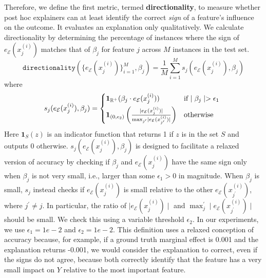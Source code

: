 \documentclass[mnsc,blindrev]{informs3}
\newcommand{\mE}{\mathcal{E}}
\begin{document}
    Therefore, we define the first metric, termed \textbf{directionality}, to measure whether post hoc explainers can at least identify the correct \textit{sign} of a feature's influence on the outcome. It evaluates an explanation only qualitatively. We calculate directionality by determining the percentage of instances where the sign of $e_\mE(x^{(i)}_j)$ matches that of $\beta_j$ for feature $j$ across $M$ instances in the test set. %
    \begin{equation}
        \label{eq:acc}
        \texttt{directionality}(\{e_\mE(x^{(i)}_j)\}_{i=1}^M,\beta_j) = \frac{1}{M} \sum_{i=1}^M s_j( e_\mE(x^{(i)}_j),\beta_j)
    \end{equation}
    where 
    \begin{equation*}
        s_j(e_\mE(x^{(i)}_j),\beta_j) = \begin{cases*}
                    \mathbf{1}_{\mathbb{R}^+}(\beta_j \cdot e_\mE(x^{(i)}_j)) & if  $\mid \beta_j\mid > \epsilon_1$  \\
                     \mathbf{1}_{(0,\epsilon_2)}\left(\frac{\mid e_\mE(x^{(i)}_j)\mid }{\max_{j'} \mid e_\mE(x^{(i)}_{j'})\mid}\right) & otherwise
                 \end{cases*}
    \end{equation*}
    Here $\mathbf{1}_S(z)$ is an indicator function that returns 1 if $z$ is in the set $S$ and outputs 0 otherwise. $s_j(e_\mE(x^{(i)}_j),\beta_j)$ is designed to facilitate a relaxed version of accuracy by checking if $\beta_j$ and $e_\mE(x^{(i)}_j)$ have the same sign only when $\beta_j$ is not very small, i.e., larger than some $\epsilon_1> 0$ in magnitude. When $\beta_j$ is small, $s_j$ instead checks if $e_\mE(x^{(i)}_j)$ is small relative to the other $e_\mE(x^{(i)}_{j^{\prime}})$, where $j^\prime \neq j$. In particular, the ratio of $\mid e_\mE(x^{(i)}_j)\mid $ and $\max_j^\prime \mid e_\mE(x^{(i)}_{j^\prime})\mid$ should be small. We check this using a variable threshold $\epsilon_2$. In our experiments, we use $\epsilon_1=1e-2$ and $\epsilon_2=1e-2$. This definition uses a relaxed conception of accuracy because, for example, if a ground truth marginal effect is 0.001 and the explanation returns -0.001, we would consider the explanation to correct, even if the signs do not agree, because both correctly identify that the feature has a very small impact on $Y$ relative to the most important feature.
    
\end{document}
